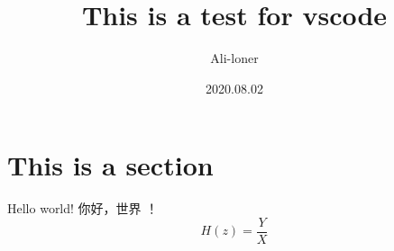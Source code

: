 \documentclass[a4paper]{article}
\title{\heiti\zihao{2} This is a test for vscode}
\author{\songti Ali-loner}
\date{2020.08.02}
\begin{document}
    \maketitle
\begin{abstract}
    \lipsum[2]
\end{abstract}
\tableofcontents
\section{This is a section}
Hello world! 你好，世界 ！
$$
H(z)=\frac{Y}{X}
$$
\end{document}
